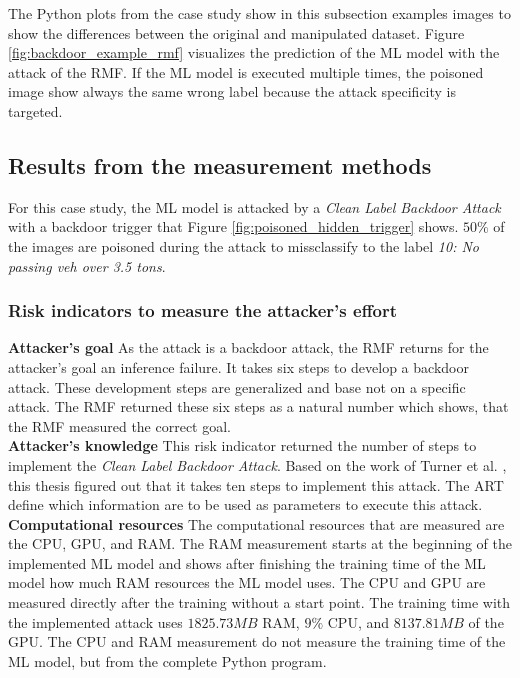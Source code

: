 The Python plots from the case study show in this subsection examples images to show the differences between the original and manipulated dataset. Figure \ref{fig:backdoor_example_rmf} visualizes the prediction of the ML model with the attack of the RMF. If the ML model is executed multiple times, the poisoned image show always the same wrong label because the attack specificity is targeted.

\subsection{Results from the measurement methods}

For this case study, the ML model is attacked by a \textit{Clean Label Backdoor Attack} with a backdoor trigger that Figure \ref{fig:poisoned_hidden_trigger} shows. $50\%$ of the images are poisoned during the attack to missclassify to the label \textit{10: No passing veh over 3.5 tons}.

\subsubsection*{Risk indicators to measure the attacker's effort}

\noindent\textbf{Attacker's goal} As the attack is a backdoor attack, the RMF returns for the attacker's goal an inference failure. It takes six steps to develop a backdoor attack. These development steps are generalized and base not on a specific attack. The RMF returned these six steps as a natural number which shows, that the RMF measured the correct goal. \\

\noindent\textbf{Attacker's knowledge} This risk indicator returned the number of steps to implement the \textit{Clean Label Backdoor Attack}. Based on the work of Turner et al. \cite{turner2018clean}, this thesis figured out that it takes ten steps to implement this attack. The ART \cite{art2018} define which information are to be used as parameters to execute this attack. \\

\noindent\textbf{Computational resources} The computational resources that are measured are the CPU, GPU, and RAM. The RAM measurement starts at the beginning of the implemented ML model and shows after finishing the training time of the ML model how much RAM resources the ML model uses. The CPU and GPU are measured directly after the training without a start point. The training time with the implemented attack uses $1825.73MB$ RAM, $9\%$ CPU, and $8137.81MB$ of the GPU. The CPU and RAM measurement do not measure the training time of the ML model, but from the complete Python program. \\ \\

